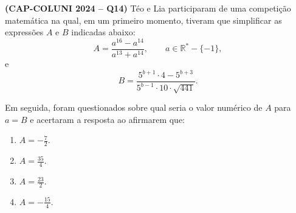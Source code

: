 \textbf{(CAP-COLUNI 2024 -- Q14)} Téo e Lia participaram de uma competição matemática na qual, em um primeiro momento, tiveram que simplificar as expressões $A$ e $B$ indicadas abaixo:
\[
A=\frac{a^{16}-a^{14}}{a^{13}+a^{14}},
\qquad a\in\mathbb{R}^{*}-\{-1\},
\]
e
\[
B=\frac{5^{b+1}\cdot4-5^{b+3}}{5^{b-1}\cdot10\cdot\sqrt{441}}.
\]

Em seguida, foram questionados sobre qual seria o valor numérico de $A$ para $a=B$ e acertaram a resposta ao afirmarem que:

\begin{enumerate}
	\item $A=-\frac72$.
	\item $A=\frac{35}{4}$.
	\item $A=\frac{23}{2}$.
	\item $A=-\frac{15}{4}$.
\end{enumerate}
